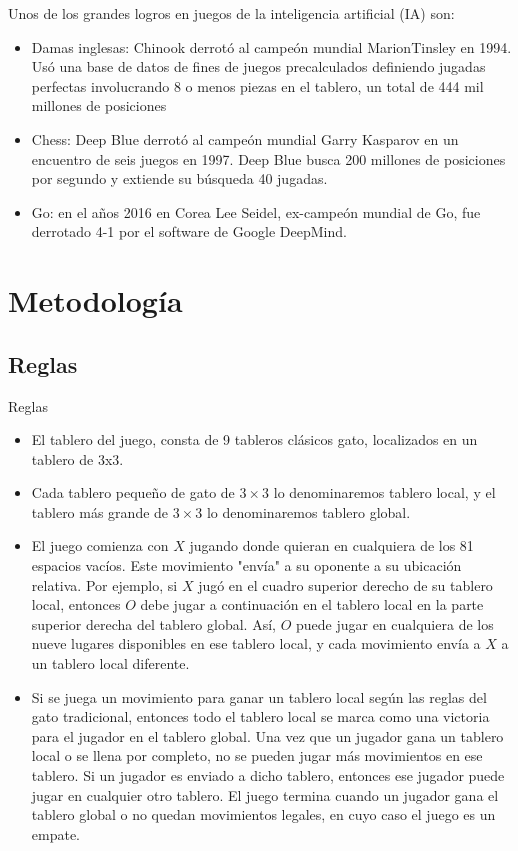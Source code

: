 \documentclass{beamer}
\begin{document}
\begin{frame}
Unos de los grandes logros en juegos de la inteligencia artificial (IA) son:
\begin{itemize}

    \item Damas inglesas: Chinook derrotó al campeón mundial MarionTinsley en 1994. Usó una base de datos de fines de juegos precalculados definiendo jugadas perfectas involucrando 8 o menos piezas en el tablero, un total de 444 mil millones de posiciones
    \item Chess: Deep Blue derrotó al campeón mundial Garry Kasparov en un encuentro de seis juegos en 1997. Deep Blue busca 200 millones de posiciones por segundo y extiende su búsqueda 40 jugadas.
    \item Go: en el años 2016 en Corea Lee Seidel, ex-campeón mundial de Go, fue derrotado 4-1 por el software de Google DeepMind.
\end{itemize}
\end{frame}

\section{Metodología}
\subsection{Reglas}
\begin{frame}{Reglas}
\begin{itemize}
    \item El tablero del juego, consta de 9 tableros clásicos gato, localizados en un tablero de 3x3.
    \item Cada tablero pequeño de gato de $3 \times 3$ lo denominaremos tablero local, y el tablero más grande de $3 \times 3$ lo denominaremos tablero global.
    \item El juego comienza con $X$ jugando donde quieran en cualquiera de los 81 espacios vacíos. Este movimiento "envía" a su oponente a su ubicación relativa. Por ejemplo, si $X$ jugó en el cuadro superior derecho de su tablero local, entonces $O$ debe jugar a continuación en el tablero local en la parte superior derecha del tablero global. Así, $O$ puede jugar en cualquiera de los nueve lugares disponibles en ese tablero local, y cada movimiento envía a $X$ a un tablero local diferente.
    \item Si se juega un movimiento para ganar un tablero local según las reglas del gato tradicional, entonces todo el tablero local se marca como una victoria para el jugador en el tablero global. Una vez que un jugador gana un tablero local o se llena por completo, no se pueden jugar más movimientos en ese tablero. Si un jugador es enviado a dicho tablero, entonces ese jugador puede jugar en cualquier otro tablero. El juego termina cuando un jugador gana el tablero global o no quedan movimientos legales, en cuyo caso el juego es un empate.
\end{itemize}
\end{frame}
\end{document}
